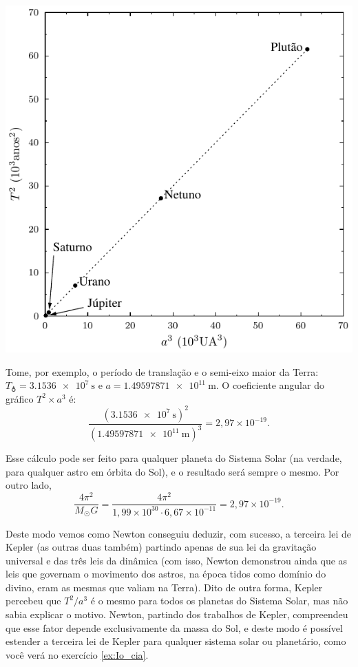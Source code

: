 \documentclass[a4paper]{article}
\begin{document}
\begin{resolucoes}
\begin{exercicio}
\begin{compactenum}[(a)]
\begin{minipage}{0.45\textwidth}
    \includegraphics[width=\textwidth]{3a_lei_Kepler_Jupiter-Plutao}
  \end{minipage}\hfill

  \item Tome, por exemplo, o período de translação e o semi-eixo maior da Terra: $T_{\earth} = \SI{3.1536e7}{\second}$ e $a = \SI{1.49597871e11}{\metre}$.
  O coeficiente angular do gráfico $T^2\times a^3$ é:
  \begin{equation*}
  \frac{\left(\SI{3.1536e7}{\second}\right)^2}{\left(\SI{1.49597871e11}{\metre}\right)^3} = 2,97\times10^{-19}.
  \end{equation*}
  
  Esse cálculo pode ser feito para qualquer planeta do Sistema Solar (na verdade, para qualquer astro em órbita do Sol), e o resultado será sempre o mesmo.  
  Por outro lado,
  \begin{equation*}
  \frac{4\pi^2}{M_{\astrosun}G} = \frac{4\pi^2}{1,99\times10^{30}\cdot 6,67\times10^{-11}} = 2,97\times10^{-19}.
  \end{equation*}
  
  Deste modo vemos como Newton conseguiu deduzir, com sucesso, a terceira lei de Kepler (as outras duas também) partindo apenas de sua lei da gravitação universal e das três leis da dinâmica (com isso, Newton demonstrou ainda que as leis que governam o movimento dos astros, na época tidos como domínio do divino, eram as mesmas que valiam na Terra).
  Dito de outra forma, Kepler percebeu que $T^2/a^3$ é o mesmo para todos os planetas do Sistema Solar, mas não sabia explicar o motivo.
  Newton, partindo dos trabalhos de Kepler, compreendeu que esse fator depende exclusivamente da massa do Sol, e deste modo é possível estender a terceira lei de Kepler para qualquer sistema solar ou planetário, como você verá no exercício \ref{ex:Io_cia}.
  

\end{compactenum}
\end{exercicio}
\end{resolucoes}
\end{document}
